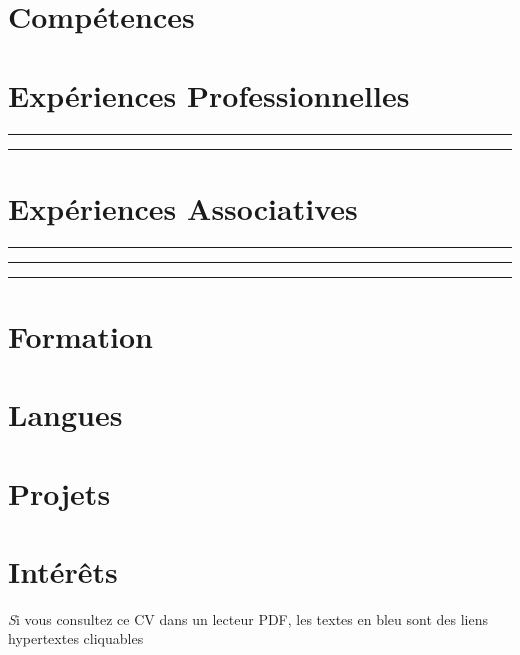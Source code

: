 \documentclass[
  a4paper
  fontsize=12pt
]{resumeats}
\begin{document}



\makeheader

\section{Compétences}

\bigskip

\section{Expériences Professionnelles}




\textcolor{endrules}{\rule{0.975\linewidth}{0.5pt}}




\textcolor{endrules}{\rule{0.975\linewidth}{0.5pt}}







\bigskip
\section{Expériences Associatives}


\textcolor{endrules}{\rule{0.975\linewidth}{0.5pt}}



\textcolor{endrules}{\rule{0.975\linewidth}{0.5pt}}



\textcolor{endrules}{\rule{0.975\linewidth}{0.5pt}}

\newpage


\bigskip
\section{Formation}


\bigskip
\section{Langues}



\bigskip
\section{Projets}


\bigskip
\section{Intérêts}


\begin{center}
  \vfill
  \scriptsize
  {
    \textit
    Si vous consultez ce CV dans un lecteur PDF, {\color{blue-800}les textes en
        bleu} sont des liens hypertextes cliquables
  }
\end{center}
\end{document}
